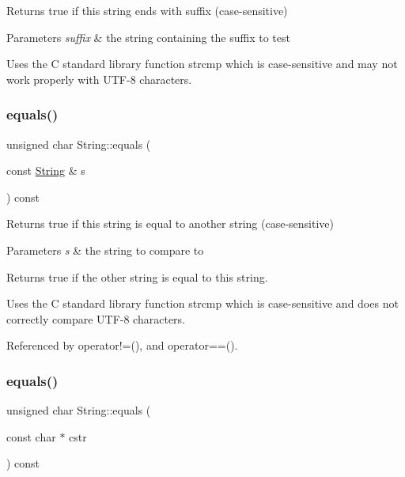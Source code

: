 Returns true if this string ends with suffix (case-\/sensitive) 


\begin{DoxyParams}{Parameters}
{\em suffix} & the string containing the suffix to test\\
\hline
\end{DoxyParams}
Uses the C standard library function strcmp which is case-\/sensitive and may not work properly with U\+T\+F-\/8 characters. \mbox{\label{class_string_a1f8b83b7dfd47de4062abc3d57e4c351}} 
\subsubsection{\texorpdfstring{equals()}{equals()}\hspace{0.1cm}{\footnotesize\ttfamily [1/2]}}
{\footnotesize\ttfamily unsigned char String\+::equals (\begin{DoxyParamCaption}\item[{const \hyperlink{class_string}{String} \&}]{s }\end{DoxyParamCaption}) const}



Returns true if this string is equal to another string (case-\/sensitive) 


\begin{DoxyParams}{Parameters}
{\em s} & the string to compare to\\
\hline
\end{DoxyParams}
\begin{DoxyReturn}{Returns}
true if the other string is equal to this string.
\end{DoxyReturn}
Uses the C standard library function strcmp which is case-\/sensitive and does not correctly compare U\+T\+F-\/8 characters. 

Referenced by operator!=(), and operator==().

\mbox{\label{class_string_add7c8de5fdbebf0fba593d97535228c2}} 
\subsubsection{\texorpdfstring{equals()}{equals()}\hspace{0.1cm}{\footnotesize\ttfamily [2/2]}}
{\footnotesize\ttfamily unsigned char String\+::equals (\begin{DoxyParamCaption}\item[{const char $\ast$}]{cstr }\end{DoxyParamCaption}) const}



